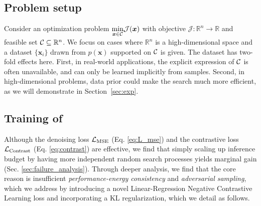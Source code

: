 \subsection{Problem setup}
\label{sec:problem_setup}

Consider an optimization problem $\underset{\boldsymbol{x}\in {\mathcal{C}}}{\min}\mathcal J(\boldsymbol{x})$  with objective $\mathcal J: \mathbb R^n\to \mathbb R$ and feasible set ${\mathcal{C}}\subseteq \mathbb R^n$. We focus on cases where $\mathbb R^n$ is a high-dimensional space and a dataset $\{\boldsymbol x_i\}$ drawn from $p(\boldsymbol x)$ supported on ${\mathcal{C}}$ is given. The dataset has two-fold effects here. First, in real-world applications, the explicit expression of ${\mathcal{C}}$ is often unavailable, and can only be learned implicitly from samples. Second, in high-dimensional problems, data prior could make the search much more efficient, as we will demonstrate in Section~\ref{sec:exp}.


\subsection{Training of \proj}
\label{sec:training_method}

Although the denoising loss ${\mathcal{L}}_\text{MSE}$ (Eq. \ref{eq:L_mse}) and the contrastive loss ${\mathcal{L}}_\text{Contrast}$ (Eq. \ref{eq:contrast}) are effective, we find that simply scaling up inference budget by having more independent random search processes yields marginal gain (Sec. \ref{sec:failure_analysis}). Through deeper analysis, we find that the core reason is insufficient \emph{performance-energy consistency} and \emph{adversarial sampling}, which we address by introducing a novel Linear-Regression Negative Contrastive Learning loss and incorporating a KL regularization, which we detail as follows.

